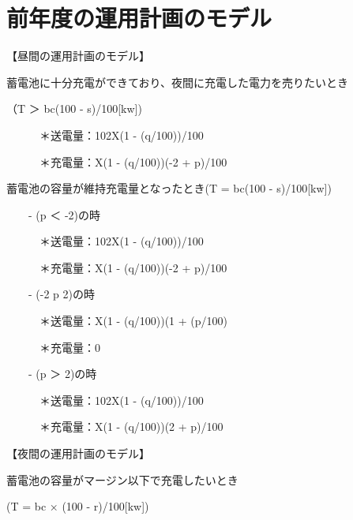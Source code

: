 \documentclass[11pt,a4paper]{jsarticle}
\begin{document}
%
%
\section*{前年度の運用計画のモデル}
\begin{flushleft}
【昼間の運用計画のモデル】

蓄電池に十分充電ができており、夜間に充電した電力を売りたいとき

（T ＞ bc(100 - s)/100[kw])
\end{flushleft}

\begin{flushleft}
　　　＊送電量：102X(1 - (q/100))/100

　　　＊充電量：X(1 - (q/100))(-2 + p)/100
\end{flushleft}

\begin{flushleft}
蓄電池の容量が維持充電量となったとき(T = bc(100 - s)/100[kw])
\end{flushleft}

\begin{flushleft}
　　- (p ＜ -2)の時

　　　＊送電量：102X(1 - (q/100))/100

　　　＊充電量：X(1 - (q/100))(-2 + p)/100
\end{flushleft}

\begin{flushleft}
　　- (-2 \hspace{0.3em}\raisebox{0.4ex}{$<$}\hspace{-0.75em}\raisebox{-.7ex}{=}\hspace{0.3em} p \hspace{0.3em}\raisebox{0.4ex}{$<$}\hspace{-0.75em}\raisebox{-.7ex}{=}\hspace{0.3em} 2)の時

　　　＊送電量：X(1 - (q/100))(1 + (p/100)

　　　＊充電量：0
\end{flushleft}

\begin{flushleft}
　　- (p ＞ 2)の時

　　　＊送電量：102X(1 - (q/100))/100

　　　＊充電量：X(1 - (q/100))(2 + p)/100
\end{flushleft}


\begin{flushleft}
【夜間の運用計画のモデル】

蓄電池の容量がマージン以下で充電したいとき

(T = bc × (100 - r)/100[kw])
\end{flushleft}
\end{document}
